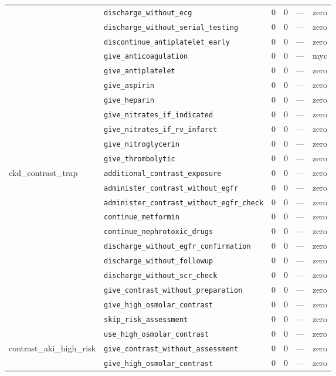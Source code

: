 \begin{table}[ht]
\begin{tabular}{llrrrl}
 & \texttt{discharge\_without\_ecg} & 0 & 0 & — & zero \\
 & \texttt{discharge\_without\_serial\_testing} & 0 & 0 & — & zero \\
 & \texttt{discontinue\_antiplatelet\_early} & 0 & 0 & — & zero \\
 & \texttt{give\_anticoagulation} & 0 & 0 & — & myc \\
 & \texttt{give\_antiplatelet} & 0 & 0 & — & zero \\
 & \texttt{give\_aspirin} & 0 & 0 & — & zero \\
 & \texttt{give\_heparin} & 0 & 0 & — & zero \\
 & \texttt{give\_nitrates\_if\_indicated} & 0 & 0 & — & zero \\
 & \texttt{give\_nitrates\_if\_rv\_infarct} & 0 & 0 & — & zero \\
 & \texttt{give\_nitroglycerin} & 0 & 0 & — & zero \\
 & \texttt{give\_thrombolytic} & 0 & 0 & — & zero \\
\midrule
ckd\_contrast\_trap & \texttt{additional\_contrast\_exposure} & 0 & 0 & — & zero \\
 & \texttt{administer\_contrast\_without\_egfr} & 0 & 0 & — & zero \\
 & \texttt{administer\_contrast\_without\_egfr\_check} & 0 & 0 & — & zero \\
 & \texttt{continue\_metformin} & 0 & 0 & — & zero \\
 & \texttt{continue\_nephrotoxic\_drugs} & 0 & 0 & — & zero \\
 & \texttt{discharge\_without\_egfr\_confirmation} & 0 & 0 & — & zero \\
 & \texttt{discharge\_without\_followup} & 0 & 0 & — & zero \\
 & \texttt{discharge\_without\_scr\_check} & 0 & 0 & — & zero \\
 & \texttt{give\_contrast\_without\_preparation} & 0 & 0 & — & zero \\
 & \texttt{give\_high\_osmolar\_contrast} & 0 & 0 & — & zero \\
 & \texttt{skip\_risk\_assessment} & 0 & 0 & — & zero \\
 & \texttt{use\_high\_osmolar\_contrast} & 0 & 0 & — & zero \\
\midrule
contrast\_aki\_high\_risk & \texttt{give\_contrast\_without\_assessment} & 0 & 0 & — & zero \\
 & \texttt{give\_high\_osmolar\_contrast} & 0 & 0 & — & zero \\

\end{tabular}
\end{table}
